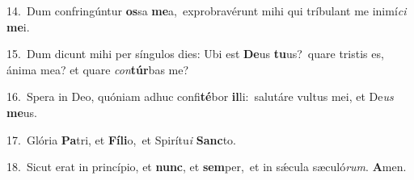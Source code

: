 {\numbfont\textcolor{\numbcolor}{14.}}~Dum confringúntur \textbf{os}\-sa \textbf{me}\-a,~\star exprobravérunt mihi qui tríbulant me inimí\textit{ci} \textbf{me}\-i.\par
{\numbfont\textcolor{\numbcolor}{15.}}~Dum dicunt mihi per síngulos dies: Ubi est \textbf{De}\-us \textbf{tu}\-us?~\star quare tristis es, ánima mea? et quare \textit{con}\-\textbf{túr}bas me?\par
{\numbfont\textcolor{\numbcolor}{16.}}~Spera in Deo, quóniam adhuc confi\-\textbf{té}\-bor \textbf{il}\-li:~\star salutáre vultus mei, et De\textit{us} \textbf{me}\-us.\par
{\numbfont\textcolor{\numbcolor}{17.}}~Glória \textbf{Pa}\-tri, et \textbf{Fí}\-\textbf{li}o,~\star et Spirítu\textit{i} \textbf{Sanc}\-to.\par
{\numbfont\textcolor{\numbcolor}{18.}}~Sicut erat in princípio, et \textbf{nunc}\-, et \textbf{sem}\-per,~\star et in sǽcula sæculó\-\textit{rum}\-. \textbf{A}\-men.\par

